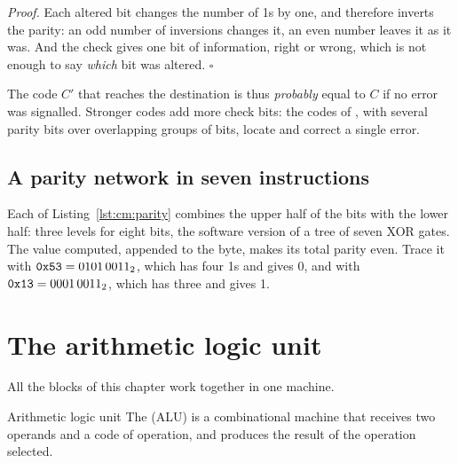\noindent\emph{Proof.} Each altered bit changes the number of 1s by one, and
therefore inverts the parity: an odd number of inversions changes it, an even
number leaves it as it was. And the check gives one bit of information, right
or wrong, which is not enough to say \emph{which} bit was altered.
\hfill$\square$

\smallskip
The code $C'$ that reaches the destination is thus \emph{probably} equal to
$C$ if no error was signalled. Stronger codes add more check bits: the codes
of \citet{hamming1950}, with several parity bits over overlapping groups of
bits, locate and correct a single error.

\subsection{A parity network in seven instructions}


Each  of Listing~\ref{lst:cm:parity} combines the upper half of the
bits with the lower half: three levels for eight bits, the software version of
a tree of seven XOR gates. The value computed, appended to the byte, makes
its total parity even. Trace it with $\texttt{0x53}=0101\,0011_2$, which has four
1s and gives 0, and with $\texttt{0x13}=0001\,0011_2$, which has three and gives 1.

\section{The arithmetic logic unit}

All the blocks of this chapter work together in one machine.

\begin{definition}{Arithmetic logic unit}
The  (ALU) is a combinational machine that
receives two operands and a code of operation, and produces the result of the
operation selected.
\end{definition}

